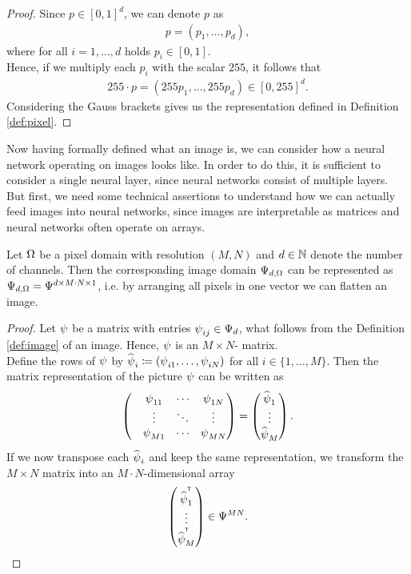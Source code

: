 \begin{proof}
Since $p\in[0,1]^d$, we can denote $p$ as
\begin{align*}
p = \left(p_1, \ldots, p_d\right),
\end{align*}
where for all $i=1,\ldots,d$ holds $p_i\in[0,1]$.\\
Hence, if we multiply each $p_i$ with the scalar $255$, it follows that
\begin{align*}
255\cdot p = \left(255p_1, \ldots, 255p_d\right)\in [0, 255]^d.
\end{align*}
Considering the Gauss brackets gives us the representation defined in Definition \ref{def:pixel}.
\end{proof}

Now having formally defined what an image is, we can consider how a neural network operating on images looks like. In order to do this, it is sufficient to consider a single neural layer, since neural networks consist of multiple layers. But first, we need some technical assertions to understand how we can actually feed images into neural networks, since images are interpretable as matrices and neural networks often operate on arrays.


\begin{lemma}\label{lemma:mat_as_array}
Let $\Omega$ be a pixel domain with resolution $(M,N)$ and $d\in\operatorname{\mathbb{N}}$ denote the number of channels. Then the corresponding image domain $\Psi_{d,\Omega}$ can be represented as $\Psi_{d,\Omega} = \Psi^{d\times M\cdot N \times 1}$, i.e. by arranging all pixels in one vector we can \glqq flatten\grqq{} an image.
\end{lemma}


\begin{proof}
Let $\operatorname{\psi}$ be a matrix with entries $\operatorname{\psi}_{ij}\in\Psi_d$, what follows from the Definition \ref{def:image} of an image. Hence, $\operatorname{\psi}$ is an $M\times N$- matrix.\\
Define the rows of $\operatorname{\psi}$ by $\widehat{\operatorname{\psi}}_i\coloneqq (\operatorname{\psi}_{i1},\ldots,\operatorname{\psi}_{iN})$ for all $i\in \{1,\ldots,M\}$. Then the matrix representation of the picture $\operatorname{\psi}$ can be written as
\begin{align*}
\begin{pmatrix}
&\operatorname{\psi}_{11} &\cdots &\operatorname{\psi}_{1N}\\
&\vdots  &\ddots		 &\vdots\\
&\operatorname{\psi}_{M1} &\cdots &\operatorname{\psi}_{MN}
\end{pmatrix}=
\begin{pmatrix}
\widehat{\operatorname{\psi}}_1\\
\vdots\\
\widehat{\operatorname{\psi}}_M
\end{pmatrix}.
\end{align*}
If we now transpose each $\widehat{\operatorname{\psi}}_i$ and keep the same representation, we transform the $M\times N$ matrix into an $M\cdot N$-dimensional array
\begin{align*}
 \begin{pmatrix}
\widehat{\operatorname{\psi}}^{^{\mkern-1.5mu\mathsf{T}}}_1\\
\vdots\\
\widehat{\operatorname{\psi}}^{^{\mkern-1.5mu\mathsf{T}}}_M
\end{pmatrix} \in \Psi^{MN}.
\end{align*}
\end{proof}

